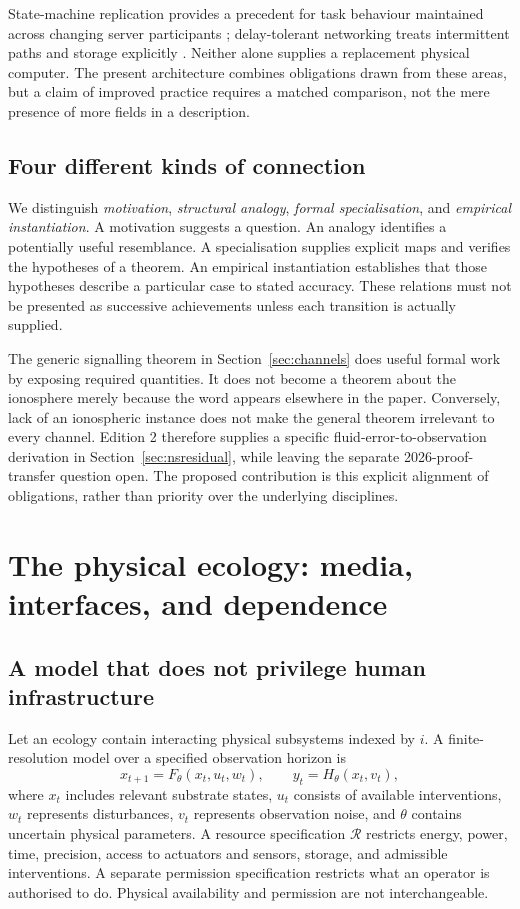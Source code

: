 \documentclass[11pt,a4paper]{article}
\theoremstyle{definition}
\theoremstyle{remark}
\newcommand{\calR}{\mathcal{R}}
\begin{document}
State-machine replication provides a precedent for task behaviour maintained across changing server participants \citep{schneider}; delay-tolerant networking treats intermittent paths and storage explicitly \citep{dtn}. Neither alone supplies a replacement physical computer. The present architecture combines obligations drawn from these areas, but a claim of improved practice requires a matched comparison, not the mere presence of more fields in a description.

\subsection{Four different kinds of connection}
We distinguish \emph{motivation}, \emph{structural analogy}, \emph{formal specialisation}, and \emph{empirical instantiation}. A motivation suggests a question. An analogy identifies a potentially useful resemblance. A specialisation supplies explicit maps and verifies the hypotheses of a theorem. An empirical instantiation establishes that those hypotheses describe a particular case to stated accuracy. These relations must not be presented as successive achievements unless each transition is actually supplied.

The generic signalling theorem in Section~\ref{sec:channels} does useful formal work by exposing required quantities. It does not become a theorem about the ionosphere merely because the word appears elsewhere in the paper. Conversely, lack of an ionospheric instance does not make the general theorem irrelevant to every channel. Edition 2 therefore supplies a specific fluid-error-to-observation derivation in Section~\ref{sec:nsresidual}, while leaving the separate 2026-proof-transfer question open. The proposed contribution is this explicit alignment of obligations, rather than priority over the underlying disciplines.


\section{The physical ecology: media, interfaces, and dependence}\label{sec:ecology}
\subsection{A model that does not privilege human infrastructure}
Let an ecology contain interacting physical subsystems indexed by $i$. A finite-resolution model over a specified observation horizon is
\begin{equation}\label{eq:ecology}
 x_{t+1}=F_\theta(x_t,u_t,w_t),\qquad y_t=H_\theta(x_t,v_t),
\end{equation}
where $x_t$ includes relevant substrate states, $u_t$ consists of available interventions, $w_t$ represents disturbances, $v_t$ represents observation noise, and $\theta$ contains uncertain physical parameters. A resource specification $\calR$ restricts energy, power, time, precision, access to actuators and sensors, storage, and admissible interventions. A separate permission specification restricts what an operator is authorised to do. Physical availability and permission are not interchangeable.
\end{document}
